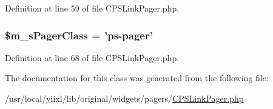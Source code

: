 Definition at line 59 of file CPSLinkPager.php.

\hypertarget{classCPSLinkPager_a5086c17fa969cb55f0b0a166a29f1158}{
\subsubsection[{\$m\_\-sPagerClass}]{\setlength{\rightskip}{0pt plus 5cm}\$m\_\-sPagerClass = 'ps-\/pager'}}
\label{classCPSLinkPager_a5086c17fa969cb55f0b0a166a29f1158}


Definition at line 68 of file CPSLinkPager.php.



The documentation for this class was generated from the following file:\begin{DoxyCompactItemize}
\item 
/usr/local/yiixl/lib/original/widgets/pagers/\hyperlink{CPSLinkPager_8php}{CPSLinkPager.php}\end{DoxyCompactItemize}
